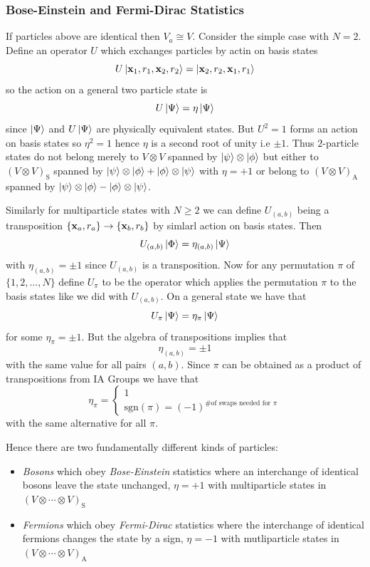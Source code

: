 \documentclass{article}
\begin{document}
\subsubsection{Bose-Einstein and Fermi-Dirac Statistics}
If particles above are identical then $ V_a \cong V $. Consider the simple case with $ N=2 $. Define an operator $ U $ which exchanges particles by actin on basis states
\[
	U\ket{\mathbf{x}_1,r_1,\mathbf{x}_2,r_2} = \ket{\mathbf{x}_2,r_2,\mathbf{x}_1,r_1}
\]
so the action on a general two particle state is
\[
	U\ket{\Psi} = \eta\ket{\Psi}
\]
since $ \ket{\Psi} $ and $ U\ket{\Psi} $ are physically equivalent states. But $ U^2 = 1 $ forms an action on basis states so $ \eta^2 = 1 $ hence $ \eta $ is a second root of unity i.e $ \pm 1 $. Thus $ 2 $-particle states do not belong merely to $ V\otimes V $ spanned by $ \ket \psi \otimes \ket\phi $ but either to $ (V\otimes V)_{\mathrm S} $ spanned by $ \ket\psi \otimes \ket{\phi} + \ket{\phi}\otimes \ket{\psi} $ with $ \eta = + 1$ or belong to $ (V\otimes V)_{\mathrm A} $ spanned by $ \ket\psi \otimes \ket \phi - \ket\phi \otimes \ket \psi $.\par
Similarly for multiparticle states with $ N\ge 2 $ we can define $ U_{(a,b)} $ being a transposition $ \{\mathbf{x}_a,r_a\}\to \{\mathbf{x}_b,r_b\} $ by simlarl action on basis states. Then
\[
	U_{(a,b)} \ket{\Phi} = \eta_{(a,b)}\ket{\Psi}
\]
with $ \eta_{(a,b)} = \pm 1 $ since $ U_{(a,b)} $ is a transposition. Now for any permutation $ \pi $ of $ \{1,2,\dots, N\} $ define $ U_{\pi} $ to be the operator which applies the permutation $ \pi $ to the basis states like we did with $ U_{(a,b)} $. On a general state we have that 
\[
	U_\pi\ket{\Psi} = \eta_\pi\ket{\Psi}
\]
for some $ \eta_\pi = \pm 1 $. But the algebra of transpositions implies that 
\[
	\eta_{(a,b)} = \pm 1 
\]
with the same value for all pairs $ (a,b) $. Since $ \pi $ can be obtained as a product of transpositions from IA Groups we have that
\[
  \eta_\pi = \begin{cases}
	  1 \\ 
	  \mathrm{sgn}(\pi) = (-1)^{\text{\# of swaps needed for } \pi}
  \end{cases} 
\]
with the same alternative for all $ \pi $.
\par
Hence there are two fundamentally different kinds of particles:
\begin{itemize}
	\item \textit{Bosons} which obey \textit{Bose-Einstein} statistics where an interchange of identical bosons leave the state unchanged, $ \eta = +1 $ with multiparticle states in $ (V\otimes \cdots \otimes V)_{\mathrm S} $
	\item \textit{Fermions} which obey \textit{Fermi-Dirac} statistics where the interchange of identical fermions changes the state by a sign, $ \eta = -1 $ with mutliparticle states in $ (V\otimes \cdots\otimes V)_{\mathrm A} $
\end{itemize}
\end{document}

